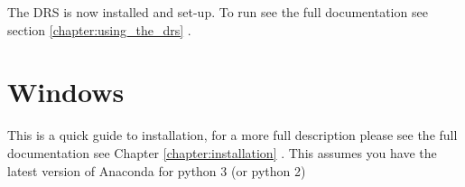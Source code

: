 The DRS is now installed and set-up. To run \ifquickguide see the full documentation \else see section \ref{chapter:using_the_drs} \fi.






\section{Windows}
\label{chapter:quickinstallation:windows}



\noindent This is a quick guide to installation, for a more full description please \ifquickguide see the full documentation \else see Chapter \ref{chapter:installation} \fi. This assumes you have the latest version of Anaconda for python 3 (or python 2)


